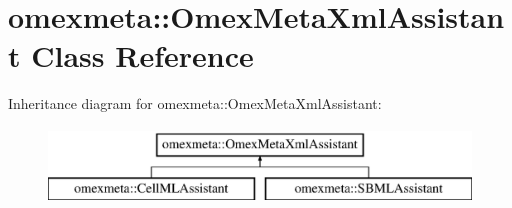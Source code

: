 \hypertarget{classomexmeta_1_1OmexMetaXmlAssistant}{}\section{omexmeta\+:\+:Omex\+Meta\+Xml\+Assistant Class Reference}
\label{classomexmeta_1_1OmexMetaXmlAssistant}
Inheritance diagram for omexmeta\+:\+:Omex\+Meta\+Xml\+Assistant\+:\begin{figure}[H]
\begin{center}
\leavevmode
\includegraphics[height=2.000000cm]{classomexmeta_1_1OmexMetaXmlAssistant}
\end{center}
\end{figure}
